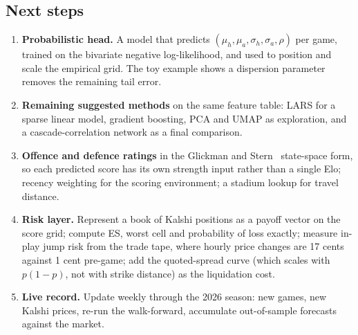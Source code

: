 \subsection{Next steps}
\begin{enumerate}[nosep]
\item \textbf{Probabilistic head.} A model that predicts $(\mu_h,\mu_a,\sigma_h,\sigma_a,\rho)$ per game, trained on the bivariate negative log-likelihood, and used to position and scale the empirical grid. The toy example shows a dispersion parameter removes the remaining tail error.
\item \textbf{Remaining suggested methods} on the same feature table: LARS for a sparse linear model, gradient boosting, PCA and UMAP as exploration, and a cascade-correlation network as a final comparison.
\item \textbf{Offence and defence ratings} in the Glickman and Stern~\cite{glickmanstern1998} state-space form, so each predicted score has its own strength input rather than a single Elo; recency weighting for the scoring environment; a stadium lookup for travel distance.
\item \textbf{Risk layer.} Represent a book of Kalshi positions as a payoff vector on the score grid; compute ES, worst cell and probability of loss exactly; measure in-play jump risk from the trade tape, where hourly price changes are 17 cents against 1 cent pre-game; add the quoted-spread curve (which scales with $p(1-p)$, not with strike distance) as the liquidation cost.
\item \textbf{Live record.} Update weekly through the 2026 season: new games, new Kalshi prices, re-run the walk-forward, accumulate out-of-sample forecasts against the market.
\end{enumerate}

